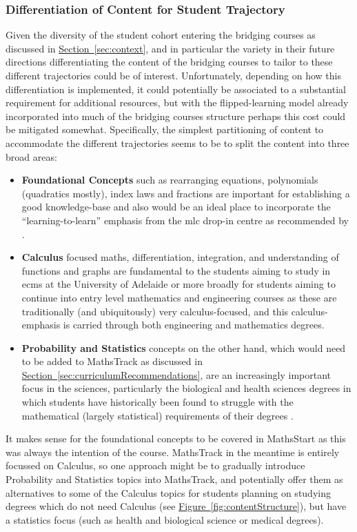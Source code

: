 \documentclass[twoside,12pt,a4paper]{report}
\newcommand{\refsec}[1]{\hyperref[sec:#1]{Section~\ref{sec:#1}}}
\newcommand{\reffig}[1]{\hyperref[fig:#1]{Figure~\ref{fig:#1}}}
\begin{document}
\subsubsection{Differentiation of Content for Student Trajectory}

Given the diversity of the student cohort entering the bridging courses as discussed in \refsec{context}, and in particular the variety in their future directions differentiating the content of the bridging courses to tailor to these different trajectories could be of interest. Unfortunately, depending on how this differentiation is implemented, it could potentially be associated to a substantial requirement for additional resources, but with the flipped-learning model already incorporated into much of the bridging courses structure perhaps this cost could be mitigated somewhat. Specifically, the simplest partitioning of content to accommodate the different trajectories seems to be to split the content into three broad areas:
\begin{itemize}
	\item \textbf{Foundational Concepts} such as rearranging equations, polynomials (quadratics mostly), index laws and fractions are important for establishing a good knowledge-base and also would be an ideal place to incorporate the ``learning-to-learn'' emphasis from the \gls{mlc} drop-in centre as recommended by . 
	\item \textbf{Calculus} focused maths, differentiation, integration, and understanding of functions and graphs are fundamental to the students aiming to study in \gls{ecms} at the University of Adelaide or more broadly for students aiming to continue into entry level mathematics and engineering courses as these are traditionally (and ubiquitously) very calculus-focused, and this calculus-emphasis is carried through both engineering and mathematics degrees. 
	\item \textbf{Probability and Statistics} concepts on the other hand, which would need to be added to MathsTrack as discussed in \refsec{curriculumRecommendations}, are an increasingly important focus in the sciences, particularly the biological and health sciences degrees in which students have historically been found to struggle with the mathematical (largely statistical) requirements of their degrees \cite{Tariq2002}. 
\end{itemize}
It makes sense for the foundational concepts to be covered in MathsStart as this was always the intention of the course. MathsTrack in the meantime is entirely focussed on Calculus, so one approach might be to gradually introduce Probability and Statistics topics into MathsTrack, and potentially offer them as alternatives to some of the Calculus topics for students planning on studying degrees which do not need Calculus (see \reffig{contentStructure}), but have a statistics focus (such as health and biological science or medical degrees).
\end{document}
